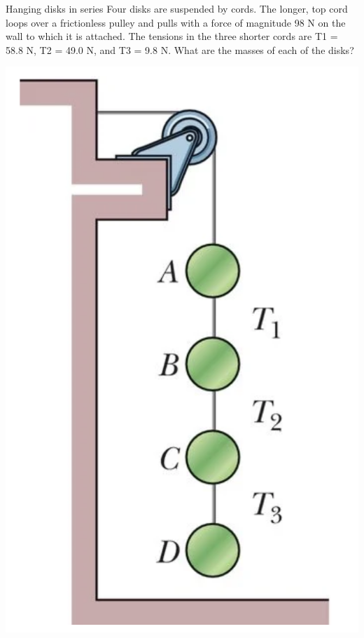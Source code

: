 \begin{frame}{Hanging disks in series}
\scriptsize
Four disks are suspended by cords. The longer, top cord loops over a frictionless pulley and pulls with a force of magnitude 98 N on the wall to which it is attached. The tensions in the three shorter cords are T1 = 58.8 N, T2 = 49.0 N, and T3 = 9.8 N. What are the masses of each of the disks?

\includegraphics[scale=0.3]{disks}
\end{frame}

